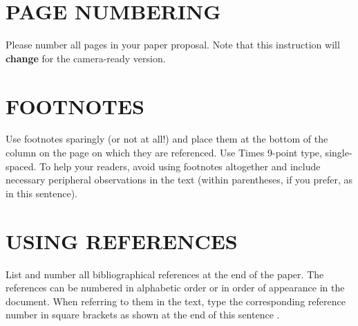 \documentclass[a4paper]{article}
\begin{document}
\section{PAGE NUMBERING}
\label{sec:page}

Please number all pages in your paper proposal. Note that this
instruction will {\bf change} for the camera-ready version.

\section{FOOTNOTES}
\label{sec:foot}

Use footnotes sparingly (or not at all!) and place them at the bottom of the
column on the page on which they are referenced. Use Times 9-point type,
single-spaced. To help your readers, avoid using footnotes altogether and
include necessary peripheral observations in the text (within parentheses, if
you prefer, as in this sentence).

\section{USING REFERENCES}
\label{sec:ref}

List and number all bibliographical references at the end of the
paper.  The references can be numbered in alphabetic order or in order
of appearance in the document.  When referring to them in the text,
type the corresponding reference number in square brackets as shown at
the end of this sentence \cite{C2}.



\end{document}

